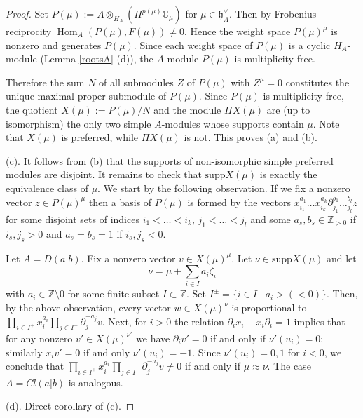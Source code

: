 \documentclass[12pt]{amsart}
\makeatletter
\def\@putname#1#2#3#4{\def\@@ref{#3}\let\old@bf\bf
        \def\bf##1{\old@bf\if?\noexpand##1?{#4}\else##1\fi}%
	#1{#2}%
        \let\bf\old@bf}
\def\@putname#1#2#3#4{\def\@@ref{#3}\let\old@bf\bf	%
	\let\old@reset@font\reset@font			%
        \def\bf##1{\old@bf\if?\noexpand##1?{#4}\else##1\fi}%
	\def\reset@font##1##2{\old@reset@font##1\if?\noexpand##2?{#4}\else##2\fi}#1{#2}%
        \let\bf\old@bf\let\reset@font\old@reset@font}
\let\my@ref=\ref
\def\ref#1{\@putname\my@ref{#1}{#1}{\tiny\rm\@@ref}}
\theoremstyle{plain} %
\numberwithin{equation}{section}
\theoremstyle{definition}
\theoremstyle{remark}
\theoremstyle{plain} %
\newcommand{\CC}{\mathbb{C}}
\newcommand{\supp}{\mathrm{supp}}
\newcommand{\gh}{\mathfrak{h}}
\def\gh{\mathfrak{h}}
\makeatother
\begin{document}
        \begin{proof} Set $P(\mu):=A\otimes_{H_A}\left( \Pi^{p(\mu)}\CC_\mu \right)$ for $\mu\in \gh^{\vee}_A$.  Then by Frobenius reciprocity
          $\operatorname{Hom}_A(P(\mu),F(\mu))\neq 0$. Hence  the weight space $P(\mu)^{\mu}$ is nonzero  and generates $P(\mu)$. Since each weight space of $P(\mu)$  is a cyclic $H_A$-module (Lemma \ref{rootsA}(d)), the $A$-module $P(\mu)$ is multiplicity free.

          Therefore the sum $N$ of all submodules $Z$ of $P(\mu)$ with $Z^{\mu} = 0$ constitutes the 
 unique maximal proper submodule of $P(\mu)$.  Since $P(\mu)$ is multiplicity free, 
         the quotient
         $X(\mu):=P(\mu)/N$ and the module $\Pi X(\mu)$ are (up to isomorphism) the only two simple $A$-modules  whose supports contain  $\mu$. Note that  $X(\mu)$ is preferred, while  $\Pi X(\mu)$ is not. This proves (a) and (b).
    
          
          (c). It follows from (b) that the supports of non-isomorphic  simple preferred modules are disjoint. It remains to check that
          $\supp X(\mu)$ is exactly the equivalence class of $\mu$.  We start by the following observation.  If we fix a nonzero vector $z \in P(\mu)^{\mu}$ then a basis of $P(\mu)$ is formed by the vectors $x_{i_1}^{a_1}\dots x_{i_k}^{a_k}\partial_{j_1}^{b_1}\dots_{j_l}^{b_l}z$ for some disjoint sets of indices $i_1<\dots <i_k$, $j_1<\dots<j_l$ and some $a_s,b_s\in\mathbb Z_{>0}$ if $i_s,j_s>0$ and $a_s=b_s=1$ if $i_s,j_s<0$. 
            
            Let $A=D(a|b)$. Fix a nonzero vector $v\in X(\mu)^{\mu}$. Let $\nu \in  \supp X(\mu)$ and let
            $$\nu=\mu+\sum_{i\in I}a_i\zeta_i$$ with $a_i\in\mathbb Z\setminus 0$ for some finite  subset $I \subset \mathbb Z$. Set $I^\pm=\{i\in I\mid a_i>(<0)\}$.
            Then, by the above observation, every vector
            $w\in  X(\mu)^{\nu}$ is proportional to $\prod_{i\in I^+}x_i^{a_i}\prod_{j\in I^{-}}\partial_j^{-a_j}v$.
            Next, for $i>0$ the relation $\partial_ix_i- x_i\partial_i=1$ implies that for any nonzero $v'\in X(\mu)^{\nu'}$   we have $\partial_iv'=0$ if and only if $\nu'(u_i)=0$; similarly 
          $x_iv'=0$ if and only $\nu'(u_i)=-1$. Since $\nu'(u_i)=0,1$ for $i<0$, we conclude that  $\prod_{i\in I^+}x_i^{a_i}\prod_{j\in I^{-}}\partial_j^{-a_j}v\neq 0$ if and only if $ \mu\approx\nu$. The case $A=Cl(a|b)$ is analogous.
          

       
                                
            (d).           Direct corollary of (c).
          \end{proof}
        
\end{document}
